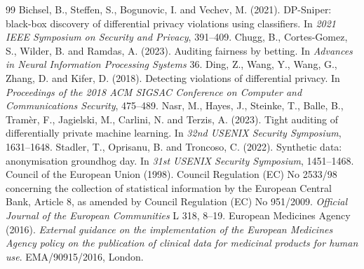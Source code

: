 \documentclass{jpc}
\theoremstyle{remark}
\begin{document}
\begin{thebibliography}{99}
 Bichsel, B., Steffen, S., Bogunovic, I. and Vechev, M. (2021). DP-Sniper: black-box discovery of differential privacy violations using classifiers. In \emph{2021 IEEE Symposium on Security and Privacy}, 391--409.
 Chugg, B., Cortes-Gomez, S., Wilder, B. and Ramdas, A. (2023). Auditing fairness by betting. In \emph{Advances in Neural Information Processing Systems} 36.
 Ding, Z., Wang, Y., Wang, G., Zhang, D. and Kifer, D. (2018). Detecting violations of differential privacy. In \emph{Proceedings of the 2018 ACM SIGSAC Conference on Computer and Communications Security}, 475--489.
 Nasr, M., Hayes, J., Steinke, T., Balle, B., Tram\`er, F., Jagielski, M., Carlini, N. and Terzis, A. (2023). Tight auditing of differentially private machine learning. In \emph{32nd USENIX Security Symposium}, 1631--1648.
 Stadler, T., Oprisanu, B. and Troncoso, C. (2022). Synthetic data: anonymisation groundhog day. In \emph{31st USENIX Security Symposium}, 1451--1468.
 Council of the European Union (1998). Council Regulation (EC) No 2533/98 concerning the collection of statistical information by the European Central Bank, Article 8, as amended by Council Regulation (EC) No 951/2009. \emph{Official Journal of the European Communities} L 318, 8--19.
 European Medicines Agency (2016). \emph{External guidance on the implementation of the European Medicines Agency policy on the publication of clinical data for medicinal products for human use}. EMA/90915/2016, London.
\end{thebibliography}
\end{document}
